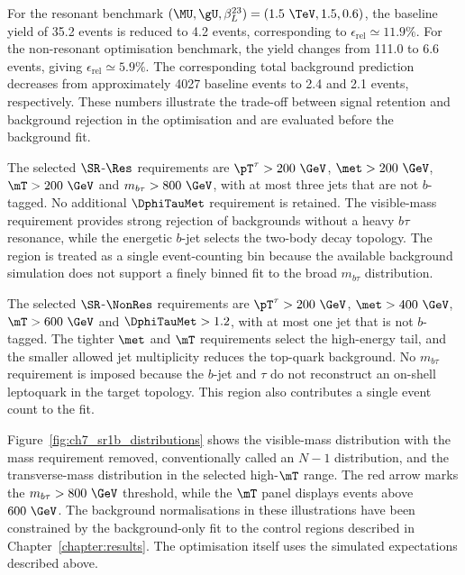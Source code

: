 For the resonant benchmark $(\MU,\gU,\beta_L^{23})=(1.5~\TeV,1.5,0.6)$, the baseline yield of 35.2 events is reduced to 4.2 events, corresponding to $\epsilon_{\mathrm{rel}}\simeq11.9\%$.
For the non-resonant optimisation benchmark, the yield changes from 111.0 to 6.6 events, giving $\epsilon_{\mathrm{rel}}\simeq5.9\%$.
The corresponding total background prediction decreases from approximately 4027 baseline events to 2.4 and 2.1 events, respectively.
These numbers illustrate the trade-off between signal retention and background rejection in the optimisation and are evaluated before the background fit.

The selected $\SR$-$\Res$ requirements are $\pT^\tau>200~\GeV$, $\met>200~\GeV$, $\mT>200~\GeV$ and $m_{b\tau}>800~\GeV$, with at most three jets that are not $b$-tagged.
No additional $\DphiTauMet$ requirement is retained.
The visible-mass requirement provides strong rejection of backgrounds without a heavy $b\tau$ resonance, while the energetic $b$-jet selects the two-body decay topology.
The region is treated as a single event-counting bin because the available background simulation does not support a finely binned fit to the broad $m_{b\tau}$ distribution.

The selected $\SR$-$\NonRes$ requirements are $\pT^\tau>200~\GeV$, $\met>400~\GeV$, $\mT>600~\GeV$ and $\DphiTauMet>1.2$, with at most one jet that is not $b$-tagged.
The tighter $\met$ and $\mT$ requirements select the high-energy tail, and the smaller allowed jet multiplicity reduces the top-quark background.
No $m_{b\tau}$ requirement is imposed because the $b$-jet and $\tau$ do not reconstruct an on-shell leptoquark in the target topology.
This region also contributes a single event count to the fit.

Figure~\ref{fig:ch7_sr1b_distributions} shows the visible-mass distribution with the mass requirement removed, conventionally called an $N-1$ distribution, and the transverse-mass distribution in the selected high-$\mT$ range.
The red arrow marks the $m_{b\tau}>800~\GeV$ threshold, while the $\mT$ panel displays events above $600~\GeV$.
The background normalisations in these illustrations have been constrained by the background-only fit to the control regions described in Chapter~\ref{chapter:results}.
The optimisation itself uses the simulated expectations described above.

